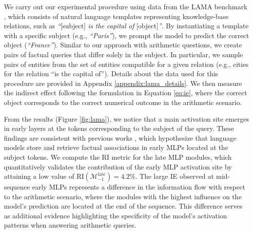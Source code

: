 \documentclass[11pt]{article}
\begin{document}
We carry out our experimental procedure using data from the LAMA benchmark \cite{petroni-etal-2019-language}, which consists of natural language templates representing knowledge-base relations, such as \textit{``}[subject]\textit{ is the capital of }[object]\textit{''}. By instantiating a template with a specific subject (e.g., \textit{``Paris''}), we prompt the model to predict the correct object (\textit{``France''}). Similar to our approach with arithmetic questions, we create pairs of factual queries that differ solely in the subject.
In particular, we sample pairs of entities from the set of entities compatible for a given relation (e.g., cities for the relation ``is the capital of''). Details about the data used for this procedure are provided in Appendix \ref{appendix:lama_details}. 
We then measure the indirect effect following the formulation in Equation \ref{eq:ie}, where the correct object corresponds to the correct numerical outcome in the arithmetic scenario.



From the results (Figure \ref{fig:lama}), we notice that a main activation site emerges in early layers at the tokens corresponding to the subject of the query.
These findings are consistent with previous works \cite{meng2022locating, geva2023dissecting}, which hypothesize that language models store and retrieve factual associations in early MLPs located at the subject tokens.
We compute the RI metric for the late MLP modules, which quantitatively validates the contribution of the early MLP activation site by attaining a low value of $\mathrm{RI}(\mathcal{M}_{-1}^{\text{late}}) =4.2$\%.
The large IE observed at mid-sequence early MLPs represents a difference in the information flow with respect to the arithmetic scenario, where the modules with the highest influence on the model's prediction are located at the end of the sequence. This difference serves as additional evidence highlighting the specificity of the model's activation patterns when answering arithmetic queries.
\end{document}

